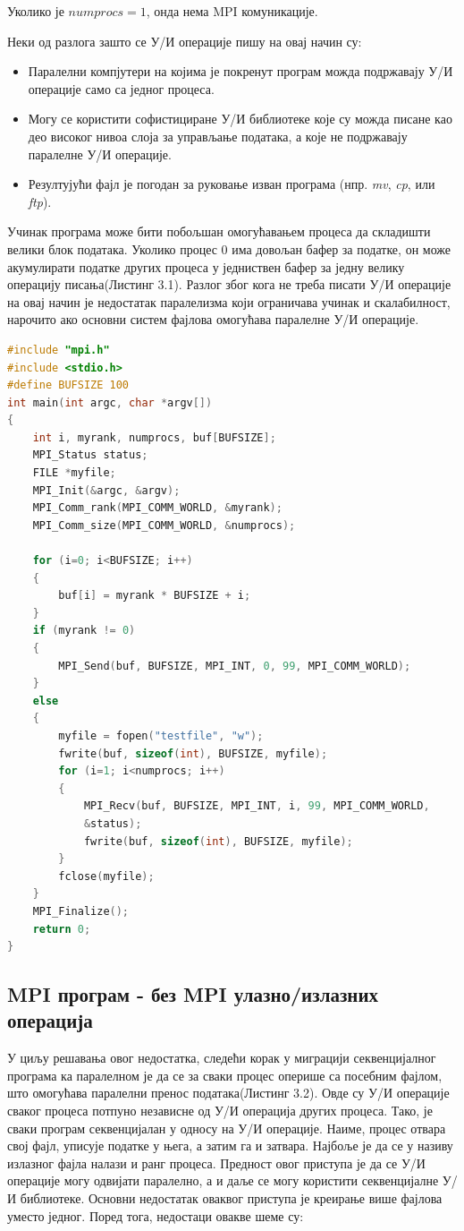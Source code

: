 Уколико је $numprocs=1$, онда нема MPI комуникације. 

Неки од разлога зашто се У/И операције пишу на овај начин су:

\begin{itemize}
\item  Паралелни компјутери на којима је покренут програм можда подржавају У/И операције само са једног процеса.
\item Могу се користити софистициране У/И библиотеке које су можда писане као део високог нивоа слоја за управљање података, а које не подржавају паралелне У/И операције.
\item Резултујући фајл је погодан за руковање изван програма (нпр. \textit{mv}, \textit{cp}, или \textit{ftp}).
\end{itemize}

Учинак програма може бити побољшан омогућавањем процеса да складишти велики блок података. Уколико процес 0 има довољан бафер за податке, он може акумулирати податке других процеса у једниствен бафер за једну велику операцију писања(Листинг 3.1). Разлог због кога не треба писати У/И операције на овај начин је недостатак паралелизма који ограничава учинак и скалабилност, нарочито ако основни систем фајлова омогућава паралелне У/И операције.

\begin{lstlisting}[style=nonumbers,frame=single,language=C, caption= MPI програм ]
#include "mpi.h"
#include <stdio.h>
#define BUFSIZE 100
int main(int argc, char *argv[])
{
	int i, myrank, numprocs, buf[BUFSIZE];
	MPI_Status status;
	FILE *myfile;
	MPI_Init(&argc, &argv);
	MPI_Comm_rank(MPI_COMM_WORLD, &myrank);
	MPI_Comm_size(MPI_COMM_WORLD, &numprocs);

	for (i=0; i<BUFSIZE; i++)
	{
		buf[i] = myrank * BUFSIZE + i;
	}
	if (myrank != 0)
	{
		MPI_Send(buf, BUFSIZE, MPI_INT, 0, 99, MPI_COMM_WORLD);
	}
	else
	{
		myfile = fopen("testfile", "w");
		fwrite(buf, sizeof(int), BUFSIZE, myfile);
		for (i=1; i<numprocs; i++)
		{
			MPI_Recv(buf, BUFSIZE, MPI_INT, i, 99, MPI_COMM_WORLD,
			&status);
			fwrite(buf, sizeof(int), BUFSIZE, myfile);
		}
		fclose(myfile);
	}
	MPI_Finalize();
	return 0;
}
\end{lstlisting}

\subsection{MPI програм - без MPI улазно/излазних операција}
У циљу решавања овог недостатка, следећи корак у миграцији секвенцијалног програма ка паралелном је да се за сваки процес оперише са посебним фајлом, што омогућава паралелни пренос података(Листинг 3.2). Овде су У/И операције сваког процеса потпуно независне од У/И операција других процеса. Тако, је сваки програм секвенцијалан у односу на У/И операције. Наиме, процес отвара свој фајл, уписује податке у њега, а затим га и затвара. Најбоље је да се у називу излазног фајла налази и ранг процеса. Предност овог приступа је да се У/И операције могу одвијати паралелно, а и даље се могу користити секвенцијалне У/И библиотеке. Основни недостатак оваквог приступа је креирање више фајлова уместо једног. Поред тога, недостаци овакве шеме су:

